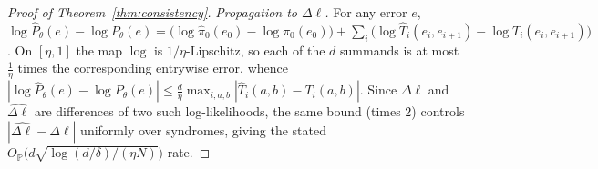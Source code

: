 \documentclass[reprint,aps,prxquantum,amsmath,amssymb,floatfix,nofootinbib,longbibliography]{revtex4-2}
\theoremstyle{definition}
\theoremstyle{remark}
\theoremstyle{plain}
\newcommand{\PP}{\mathbb{P}}
\newcommand{\abs}[1]{\left\lvert #1 \right\rvert}
\begin{document}
\begin{proof}[Proof of Theorem~\ref{thm:consistency}]
\emph{Propagation to $\Delta\ell$.} For any error $e$,
$\log\hat P_\theta(e)-\log P_\theta(e)=\bigl(\log\hat\pi_0(e_0)-\log\pi_0(e_0)\bigr)
+\sum_{i}\bigl(\log\hat T_i(e_i,e_{i+1})-\log T_i(e_i,e_{i+1})\bigr)$.
On $[\eta,1]$ the map $\log$ is $1/\eta$-Lipschitz, so each of the $d$ summands
is at most $\tfrac1\eta$ times the corresponding entrywise error, whence
$\abs{\log\hat P_\theta(e)-\log P_\theta(e)}\le
\tfrac{d}{\eta}\max_{i,a,b}\abs{\hat T_i(a,b)-T_i(a,b)}$. Since $\Delta\ell$ and
$\hat{\Delta\ell}$ are differences of two such log-likelihoods, the same bound
(times $2$) controls $\abs{\hat{\Delta\ell}-\Delta\ell}$ uniformly over
syndromes, giving the stated
$O_\PP\!\bigl(d\sqrt{\log(d/\delta)/(\eta N)}\bigr)$ rate.
\end{proof}
\end{document}
